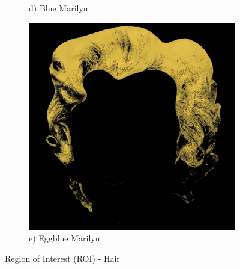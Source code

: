 \documentclass{article}
\begin{document}
\begin{figure}[htbp]
\begin{subfigure}[b]{0.19\textwidth}
        \caption*{d) Blue Marilyn}
    \end{subfigure}
    \hfill
    \begin{subfigure}[b]{0.19\textwidth}
        \includegraphics[width=\textwidth]{main_files/figure-latex/12_2_eggblue_marilyn_hair_extraction.jpg}
        \caption*{e) Eggblue Marilyn}
    \end{subfigure}
    
    \caption{Region of Interest (ROI) - Hair}
\end{figure}
\end{document}
